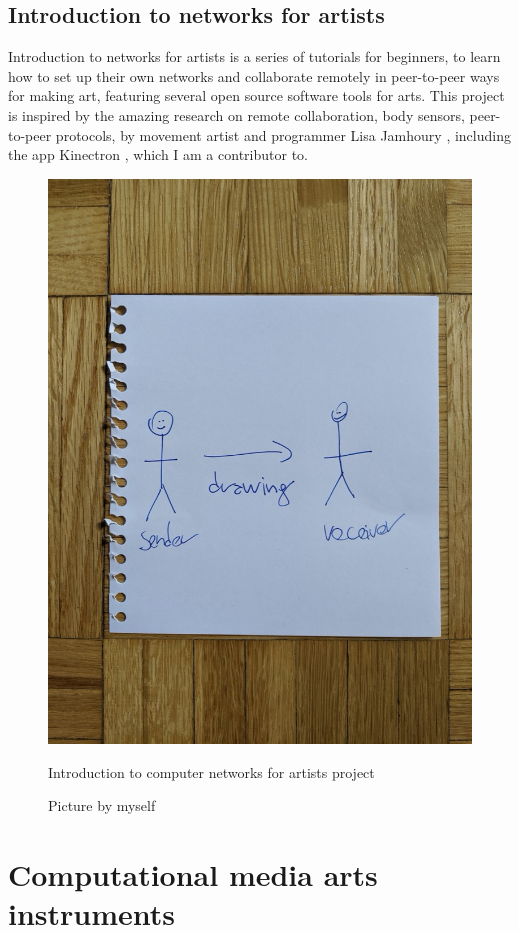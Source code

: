 \subsection{Introduction to networks for artists}

Introduction to networks for artists \cite{website-intro-to-computer-networks-for-artists} is a series of tutorials for beginners, to learn how to set up their own networks and collaborate remotely in peer-to-peer ways for making art, featuring several open source software tools for arts. This project is inspired by the amazing research on remote collaboration, body sensors, peer-to-peer protocols, by movement artist and programmer Lisa Jamhoury \cite{website-lisa-jamhoury}, including the app Kinectron \cite{website-repository-kinectron}, which I am a contributor to.

\begin{figure}[ht]
  \centering
  \includegraphics[width=0.75\linewidth,height=0.35\textheight,keepaspectratio]{images/intro-to-computer-networks-for-artists.jpg}
  \caption{Introduction to computer networks for artists project}
  \caption*{Picture by myself}
  \label{fig:intro-to-computer-networks-for-artists}
\end{figure}

\section{Computational media arts instruments}

